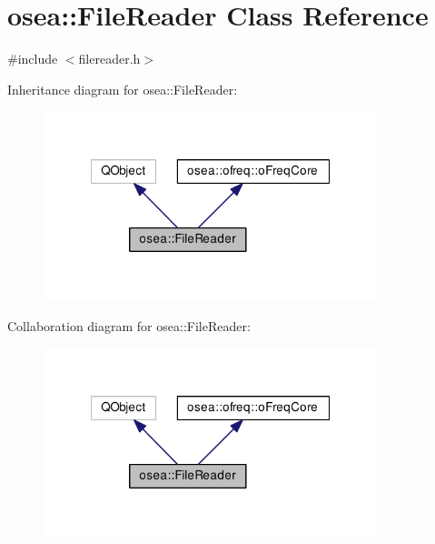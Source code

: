 \hypertarget{classosea_1_1_file_reader}{\section{osea\-:\-:File\-Reader Class Reference}
\label{classosea_1_1_file_reader}
}


{\ttfamily \#include $<$filereader.\-h$>$}



Inheritance diagram for osea\-:\-:File\-Reader\-:
\nopagebreak
\begin{figure}[H]
\begin{center}
\leavevmode
\includegraphics[width=275pt]{classosea_1_1_file_reader__inherit__graph}
\end{center}
\end{figure}


Collaboration diagram for osea\-:\-:File\-Reader\-:
\nopagebreak
\begin{figure}[H]
\begin{center}
\leavevmode
\includegraphics[width=275pt]{classosea_1_1_file_reader__coll__graph}
\end{center}
\end{figure}
